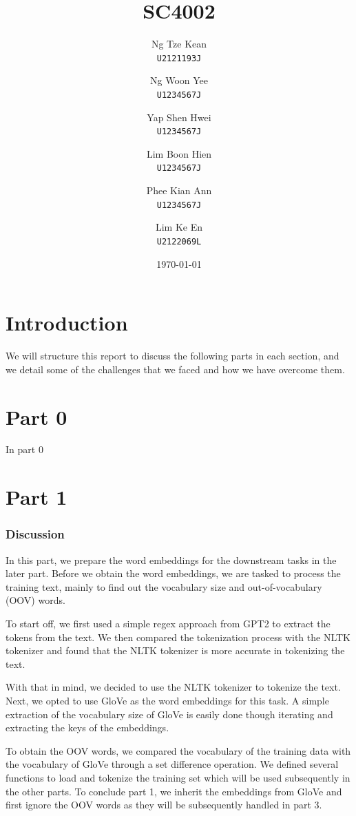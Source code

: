 \documentclass{article}
\title{SC4002}
\author{
  Ng Tze Kean\\
  \texttt{U2121193J} \and
  Ng Woon Yee\\
  \texttt{U1234567J} \and
  Yap Shen Hwei\\
  \texttt{U1234567J} \and
  Lim Boon Hien\\
  \texttt{U1234567J} \and
  Phee Kian Ann\\
  \texttt{U1234567J} \and
  Lim Ke En\\
  \texttt{U2122069L}
}
\date{\today}
\begin{document}
\maketitle

\section*{Introduction}
We will structure this report to discuss the following parts in each section,
and we detail some of the challenges that we faced and how we have overcome
them.

\section*{Part 0}

In part 0

\section*{Part 1}

\subsubsection*{Discussion}

In this part, we prepare the word embeddings for the downstream tasks in the
later part. Before we obtain the word embeddings, we are tasked to process the
training text, mainly to find out the vocabulary size and out-of-vocabulary
(OOV) words.

To start off, we first used a simple regex approach from GPT2 to extract the
tokens from the text. We then compared the tokenization process with the NLTK
tokenizer and found that the NLTK tokenizer is more accurate in tokenizing the
text.


With that in mind, we decided to use the NLTK tokenizer to tokenize the text.
Next, we opted to use GloVe as the word embeddings for this task. A simple
extraction of the vocabulary size of GloVe is easily done though iterating and
extracting the keys of the embeddings.

To obtain the OOV words, we compared the vocabulary of the training data with
the vocabulary of GloVe through a set difference operation. We defined several
functions to load and tokenize the training set which will be used subsequently
in the other parts. To conclude part 1, we inherit the embeddings from GloVe
and first ignore the OOV words as they will be subsequently handled in part 3.
\end{document}
